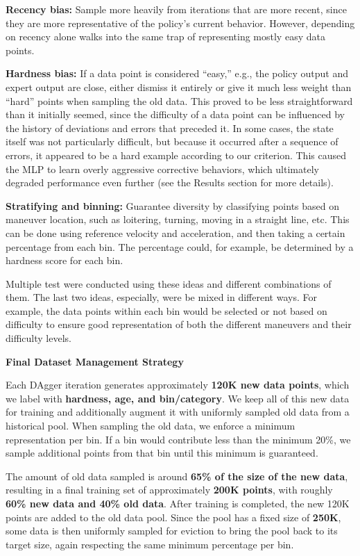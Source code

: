 \textbf{Recency bias:} Sample more heavily from iterations that are more
recent, since they are more representative of the policy's current
behavior. However, depending on recency alone walks into the same trap
of representing mostly easy data points.

\textbf{Hardness bias:} If a data point is considered “easy,” e.g., the
policy output and expert output are close, either dismiss it entirely or
give it much less weight than “hard” points when sampling the old data.
This proved to be less straightforward than it initially seemed, since
the difficulty of a data point can be influenced by the history of
deviations and errors that preceded it. In some cases, the state itself
was not particularly difficult, but because it occurred after a
sequence of errors, it appeared to be a hard example according to our
criterion. This caused the MLP to learn overly aggressive corrective
behaviors, which ultimately degraded performance even further (see the
Results section for more details).

\textbf{Stratifying and binning:} Guarantee diversity by classifying
points based on maneuver location, such as loitering, turning, moving in
a straight line, etc. This can be done using reference velocity and
acceleration, and then taking a certain percentage from each bin. The
percentage could, for example, be determined by a hardness score for
each bin.

Multiple test were conducted using these ideas and different
combinations of them. The last two ideas, especially, were be mixed in
different ways. For example, the data points within each bin would be
selected or not based on difficulty to ensure good representation of
both the different maneuvers and their difficulty levels.

\noindent\textbf{Final Dataset Management Strategy}

Each DAgger iteration generates approximately \textbf{120K new data
points}, which we label with \textbf{hardness, age, and bin/category}.
We keep all of this new data for training and additionally augment it
with uniformly sampled old data from a historical pool. When sampling
the old data, we enforce a minimum representation per bin. If a bin
would contribute less than the minimum 20\%, we sample additional points
from that bin until this minimum is guaranteed.

The amount of old data sampled is around \textbf{65\% of the size of the
new data}, resulting in a final training set of approximately
\textbf{200K points}, with roughly \textbf{60\% new data and 40\% old
data}. After training is completed, the new 120K points are added to
the old data pool. Since the pool has a fixed size of \textbf{250K},
some data is then uniformly sampled for eviction to bring the pool back
to its target size, again respecting the same minimum percentage per
bin.

